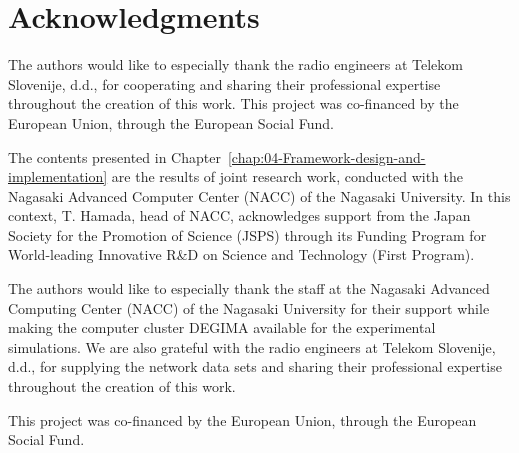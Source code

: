 
\chapter{Acknowledgments}


\noindent The authors would like to especially thank the radio engineers
at Telekom Slovenije, d.d., for cooperating and sharing their professional
expertise throughout the creation of this work. This project was co-financed
by the European Union, through the European Social Fund.

The contents presented in Chapter~\ref{chap:04-Framework-design-and-implementation}
are the results of joint research work, conducted with the Nagasaki
Advanced Computer Center (NACC) of the Nagasaki University. In this
context, T. Hamada, head of NACC, acknowledges support from the Japan
Society for the Promotion of Science (JSPS) through its Funding Program
for World-leading Innovative R\&D on Science and Technology (First
Program).

The authors would like to especially thank the staff at the Nagasaki
Advanced Computing Center (NACC) of the Nagasaki University for their
support while making the computer cluster DEGIMA available for the
experimental simulations. We are also grateful with the radio engineers
at Telekom Slovenije, d.d., for supplying the network data sets and
sharing their professional expertise throughout the creation of this
work.

This project was co-financed by the European Union, through the European
Social Fund.
